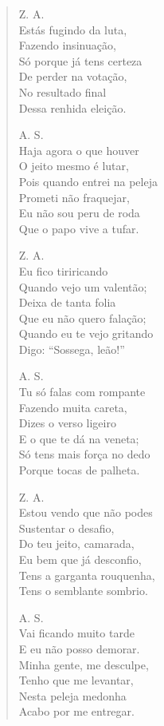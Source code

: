 \begin{verse}
Z. A.\\
Estás fugindo da luta,\\
Fazendo insinuação,\\
Só porque já tens certeza\\
De perder na votação,\\
No resultado final\\
Dessa renhida eleição.

A. S.\\
Haja agora o que houver\\
O jeito mesmo é lutar,\\
Pois quando entrei na peleja\\
Prometi não fraquejar,\\
Eu não sou peru de roda\\
Que o papo vive a tufar.


Z. A.\\
Eu fico tiriricando\\
Quando vejo um valentão;\\
Deixa de tanta folia\\
Que eu não quero falação;\\
Quando eu te vejo gritando\\
Digo: “Sossega, leão!”

A. S.\\
Tu só falas com rompante\\
Fazendo muita careta,\\
Dizes o verso ligeiro\\
E o que te dá na veneta;\\
Só tens mais força no dedo\\
Porque tocas de palheta.

Z. A.\\
Estou vendo que não podes\\
Sustentar o desafio,\\
Do teu jeito, camarada,\\
Eu bem que já desconfio,\\
Tens a garganta rouquenha,\\
Tens o semblante sombrio.

A. S.\\
Vai ficando muito tarde\\
E eu não posso demorar.\\
Minha gente, me desculpe,\\
Tenho que me levantar,\\
Nesta peleja medonha\\
Acabo por me entregar.



\end{verse}
